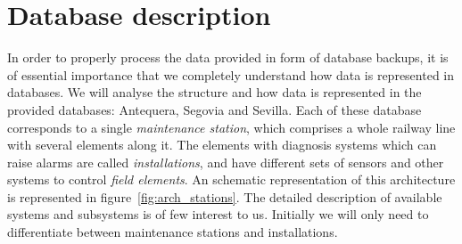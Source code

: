 \documentclass[a4paper,12pt]{article}
\begin{document}
\newpage
\tableofcontents %
\cleardoublepage
{} %
\listoffigures %

\cleardoublepage
{} %
\listoftables %
\cleardoublepage

\setcounter{page}{1}

\section{Database description}\label{sec:database_description}
In order to properly process the data provided in form of database backups, it is of essential importance that we completely understand how data is represented in databases. We will analyse the structure and how data is represented in the provided databases: Antequera, Segovia and Sevilla. Each of these database corresponds to a single \emph{maintenance station}, which comprises a whole railway line with several elements along it. The elements with diagnosis systems which can raise alarms are called \emph{installations}, and have different sets of sensors and other systems to control \emph{field elements}. An schematic representation of this architecture is represented in figure~\ref{fig:arch_stations}. The detailed description of available systems and subsystems is of few interest to us. Initially we will only need to differentiate between maintenance stations and installations.
\end{document}
